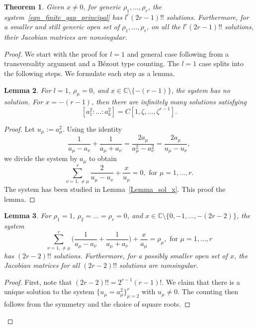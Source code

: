 \documentclass[11pt]{amsart}
\newtheorem{theorem}{Theorem}[section]
\newtheorem{lemma}[theorem]{Lemma}
\theoremstyle{remark}
\numberwithin{equation}{section}
\begin{document}
\begin{theorem} Given $x \neq 0$, for generic $\rho_1,\dots, \rho_r$, the system~\eqref{eqn_finite_gap_principal} has $l^r(2r-1)!!$ solutions. Furthermore, for a smaller and still generic open set of $\rho_1,\dots,\rho_r$, on all the $l^r (2r-1)!!$ solutions, their Jacobian matrices are nonsingular.
\end{theorem}
\begin{proof}
We start with the proof for $l=1$ and general case following from a transversality argument and a Bézout type counting. The $l=1$ case splits into the following steps. We formulate each step as a lemma. 
\begin{lemma} For $l=1$, $\rho_\mu=0$, and $x \in \mathbb{C} \setminus \{ -(r-1) \}$, the system has no solution.
For $x= -(r-1)$, then there are infinitely many solutions satisfying
\[
    [a_1^2: \dots :a_k^2] = C[1,\zeta,\dots, \zeta^{r-1}].
\]
\end{lemma}
\begin{proof}
Let $u_\mu := a_\mu^2$. Using the identity 
\[
    \frac{1}{a_\mu - a_\nu} + \frac{1}{a_\mu+a_\nu} = \frac{2a_\mu}{a_\mu^2 - a_\nu^2} = \frac{2a_\mu}{u_\mu - u_\nu},
\]
we divide the system by $a_\mu$ to obtain
\[
    \sum_{\nu=1,\neq \mu}^r\frac{2}{u_\mu -u_\nu} + \frac{x}{u_\mu} =0, \text{ for }\mu=1,\dots,r.
\]
The system has been studied in Lemma~\ref{Lemma_sol_x}. This proof the lemma.
\end{proof}

\begin{lemma}
For $\rho_1=1$, $\rho_2=\dots=\rho_r = 0$, and $x \in \mathbb{C} \setminus \{ 0, -1, \dots, -(2r-2) \}$, the system
\[
    \sum_{\nu=1, \neq \mu}^r \Big( \frac{1}{a_\mu - a_\nu} + \frac{1}{a_\mu+a_\nu} \Big) + \frac{x}{a_\mu} = \rho_\mu, \text{ for }\mu=1,\dots,r
\]
has $(2r-2)!!$ solutions. Furthermore, for a possibly smaller open set of $x$, the Jacobian matrices for all $(2r-2)!!$ solutions are nonsingular.
\end{lemma}
\begin{proof}
First, note that $(2r-2)!! = 2^{r-1} (r-1)!$. We claim that there is a unique solution to the system $\{ u_{\mu} = a_{\mu}^2 \}_{\mu=2}^{r}$ with $u_{\mu} \neq 0$. The counting then follows from the symmetry and the choice of square roots.


\end{proof}
\end{proof}
\end{document}
